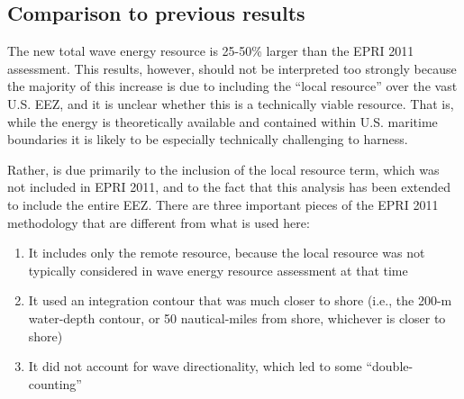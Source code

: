 \subsection{Comparison to previous results}


The new total wave energy resource is 25-50\% larger than the EPRI 2011 assessment. This results, however, should not be interpreted too strongly because the majority of this increase is due to including the ``local resource'' over the vast U.S. EEZ, and it is unclear whether this is a technically viable resource. That is, while the energy is theoretically available and contained within U.S. maritime boundaries it is likely to be especially technically challenging to harness.


Rather,  is due primarily to the inclusion of the local resource term, which was not included in EPRI 2011, and to the fact that this analysis has been extended to include the entire EEZ. 
There are three important pieces of the EPRI 2011 methodology that are different from what is used here:
\begin{enumerate}
\item It includes only the remote resource, because the local resource was not typically considered in wave energy resource assessment at that time
\item It used an integration contour that was much closer to shore (i.e., the 200-m water-depth contour, or 50 nautical-miles from shore, whichever is closer to shore)
\item It did not account for wave directionality, which led to some ``double-counting'' \cite{nationalresearchcouncilEvaluationDepartmentEnergy2013}
\end{enumerate}


